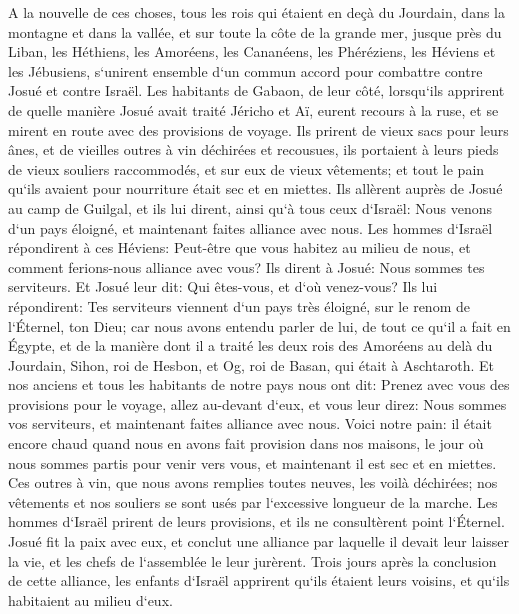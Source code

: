 \verse A la nouvelle de ces choses, tous les rois qui étaient en deçà du Jourdain, dans la montagne et dans la vallée, et sur toute la côte de la grande mer, jusque près du Liban, les Héthiens, les Amoréens, les Cananéens, les Phéréziens, les Héviens et les Jébusiens, 
\verse s`unirent ensemble d`un commun accord pour combattre contre Josué et contre Israël. 
\verse Les habitants de Gabaon, de leur côté, lorsqu`ils apprirent de quelle manière Josué avait traité Jéricho et Aï, 
\verse eurent recours à la ruse, et se mirent en route avec des provisions de voyage. Ils prirent de vieux sacs pour leurs ânes, et de vieilles outres à vin déchirées et recousues, 
\verse ils portaient à leurs pieds de vieux souliers raccommodés, et sur eux de vieux vêtements; et tout le pain qu`ils avaient pour nourriture était sec et en miettes. 
\verse Ils allèrent auprès de Josué au camp de Guilgal, et ils lui dirent, ainsi qu`à tous ceux d`Israël: Nous venons d`un pays éloigné, et maintenant faites alliance avec nous. 
\verse Les hommes d`Israël répondirent à ces Héviens: Peut-être que vous habitez au milieu de nous, et comment ferions-nous alliance avec vous? 
\verse Ils dirent à Josué: Nous sommes tes serviteurs. Et Josué leur dit: Qui êtes-vous, et d`où venez-vous? 
\verse Ils lui répondirent: Tes serviteurs viennent d`un pays très éloigné, sur le renom de l`Éternel, ton Dieu; car nous avons entendu parler de lui, de tout ce qu`il a fait en Égypte, 
\verse et de la manière dont il a traité les deux rois des Amoréens au delà du Jourdain, Sihon, roi de Hesbon, et Og, roi de Basan, qui était à Aschtaroth. 
\verse Et nos anciens et tous les habitants de notre pays nous ont dit: Prenez avec vous des provisions pour le voyage, allez au-devant d`eux, et vous leur direz: Nous sommes vos serviteurs, et maintenant faites alliance avec nous. 
\verse Voici notre pain: il était encore chaud quand nous en avons fait provision dans nos maisons, le jour où nous sommes partis pour venir vers vous, et maintenant il est sec et en miettes. 
\verse Ces outres à vin, que nous avons remplies toutes neuves, les voilà déchirées; nos vêtements et nos souliers se sont usés par l`excessive longueur de la marche. 
\verse Les hommes d`Israël prirent de leurs provisions, et ils ne consultèrent point l`Éternel. 
\verse Josué fit la paix avec eux, et conclut une alliance par laquelle il devait leur laisser la vie, et les chefs de l`assemblée le leur jurèrent. 
\verse Trois jours après la conclusion de cette alliance, les enfants d`Israël apprirent qu`ils étaient leurs voisins, et qu`ils habitaient au milieu d`eux. 
